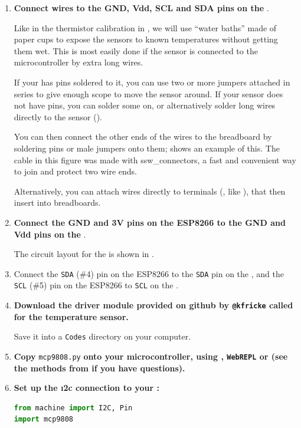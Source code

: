 \begin{enumerate}
	\item \textbf{Connect wires to the GND, Vdd, SCL and SDA pins on the }.

	Like in the thermistor calibration in , we will use ``water baths'' made of paper cups to expose the  sensors to known temperatures without getting them wet.
	This is most easily done if the sensor is connected to the microcontroller by extra long wires.

	\smallskip
	If your  has pins soldered to it, you can use two or more jumpers attached in series to give enough scope to move the sensor around.
	If your sensor does not have pins, you can solder some on, or alternatively solder long wires directly to the sensor ().

	You can then connect the other ends of the wires to the breadboard by soldering pins or male jumpers onto them;  shows an example of this.
	The cable in this figure was made with \glspl{ssw_connector}, a fast and convenient way to join and protect two wire ends.

	Alternatively, you can attach wires directly to terminals (\eg, like ), that then insert into breadboards.


	\item \textbf{Connect the GND and 3V pins on the ESP8266 to the GND and Vdd pins on the }.

	The circuit layout for the  is shown in .


	\item Connect the \texttt{SDA} (\#4) pin on the ESP8266 to the \texttt{SDA} pin on the , and the  \texttt{SCL} (\#5) pin on the ESP8266 to \texttt{SCL} on the .
	\item \textbf{Download the driver module provided on github by \texttt{@kfricke} called  for the  temperature sensor.}

	Save it into a \texttt{Codes} directory on your computer.

	\item \textbf{Copy } \lstinline{mcp9808.py} \textbf{onto your microcontroller, using \thonny, \texttt{WebREPL} or \mpfshell (see the methods from  if you have questions).}
	\item %
	\textbf{Set up the \i2c connection to your :}
\begin{lstlisting}[language=Python]
from machine import I2C, Pin
import mcp9808


\end{lstlisting}
\end{enumerate}
